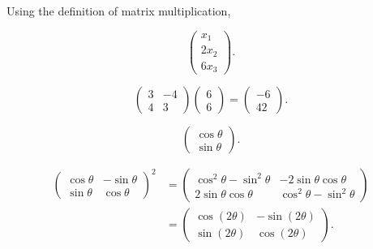 \documentclass[11pt,oneside]{article}
\begin{document}
\begin{solution}
Using the definition of matrix multiplication,
\begin{problemsubparts}
    \item
    \[
        \boxed{
        \begin{pmatrix}
            x_1\\2x_2\\6x_3
        \end{pmatrix}}.
    \]
    \item
    \[
        \begin{pmatrix}
            3&-4\\4&3
        \end{pmatrix}
        \begin{pmatrix}
            6\\6
        \end{pmatrix}
        =
        \boxed{
        \begin{pmatrix}
            -6\\42
        \end{pmatrix}}.
    \]
    \item
    \[
        \boxed{
        \begin{pmatrix}
            \cos\theta\\
            \sin\theta
        \end{pmatrix}}.
    \]
    \item
    \begin{align*}
        \begin{pmatrix}
            \cos\theta&-\sin\theta\\
            \sin\theta&\cos\theta
        \end{pmatrix}^{2}
        &=
        \begin{pmatrix}
            \cos^2\theta-\sin^2\theta&-2\sin\theta\cos\theta\\
            2\sin\theta\cos\theta&\cos^2\theta-\sin^2\theta
        \end{pmatrix}\\
        &=
        \boxed{
        \begin{pmatrix}
            \cos(2\theta)&-\sin(2\theta)\\
            \sin(2\theta)&\cos(2\theta)
        \end{pmatrix}}.
    \end{align*}
\end{problemsubparts}
\end{solution}
\end{document}
